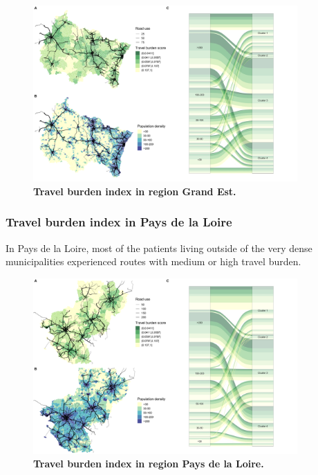 \begin{figure}[H]
    \includegraphics[width=0.9\textwidth]{images/routes/fig4_44.png}
    \centering
    \caption{
        \textbf{Travel burden index in region Grand Est.}
    }
    \label{fig:routes-burden-index-ge}
\end{figure}

\subsubsection{Travel burden index in Pays de la Loire}

In Pays de la Loire, most of the patients living outside of the very dense
municipalities experienced routes with medium or high travel burden.

\begin{figure}[H]
    \includegraphics[width=0.9\textwidth]{images/routes/fig4_52.png}
    \centering
    \caption{
        \textbf{Travel burden index in region Pays de la Loire.}
    }
    \label{fig:routes-burden-index-pdl}
\end{figure}

